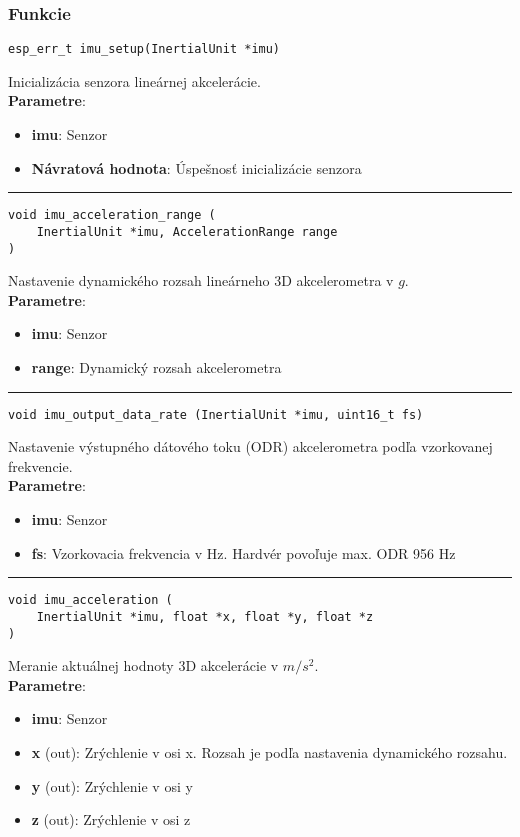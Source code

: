 \subsubsection*{Funkcie}
\begin{lstlisting}[style=docs]
esp_err_t imu_setup(InertialUnit *imu)
\end{lstlisting}
   Inicializácia senzora lineárnej akcelerácie. \\
\textbf{Parametre}:
\begin{itemize}[noitemsep, topsep=0pt]
	\item \textbf{imu}: Senzor
	\item \textbf{Návratová hodnota}: Úspešnosť inicializácie senzora
\end{itemize}
\bigbreak
\hrule

\begin{lstlisting}[style=docs]
void imu_acceleration_range (
	InertialUnit *imu, AccelerationRange range
)
\end{lstlisting}
   Nastavenie dynamického rozsah lineárneho 3D akcelerometra v $g$. \\
\textbf{Parametre}:
\begin{itemize}[noitemsep, topsep=0pt]
	\item \textbf{imu}: Senzor
	\item \textbf{range}: Dynamický rozsah akcelerometra
\end{itemize}
\bigbreak
\hrule

\begin{lstlisting}[style=docs]
void imu_output_data_rate (InertialUnit *imu, uint16_t fs)
\end{lstlisting}
   Nastavenie výstupného dátového toku (ODR) akcelerometra podľa vzorkovanej frekvencie. \\
\textbf{Parametre}:
\begin{itemize}[noitemsep, topsep=0pt]
	\item \textbf{imu}: Senzor
	\item \textbf{fs}: Vzorkovacia frekvencia v Hz. Hardvér povoľuje max. ODR 956 Hz
\end{itemize}
\bigbreak
\hrule

\begin{lstlisting}[style=docs]
void imu_acceleration (
	InertialUnit *imu, float *x, float *y, float *z
)
\end{lstlisting}
   Meranie aktuálnej hodnoty 3D akcelerácie v $m/s^2$. \\
\textbf{Parametre}:
\begin{itemize}[noitemsep, topsep=0pt]
	\item \textbf{imu}: Senzor
	\item \textbf{x} (out): Zrýchlenie v osi x. Rozsah je podľa nastavenia dynamického rozsahu.
 	\item \textbf{y} (out): Zrýchlenie v osi y
    \item \textbf{z} (out): Zrýchlenie v osi z
\end{itemize}


